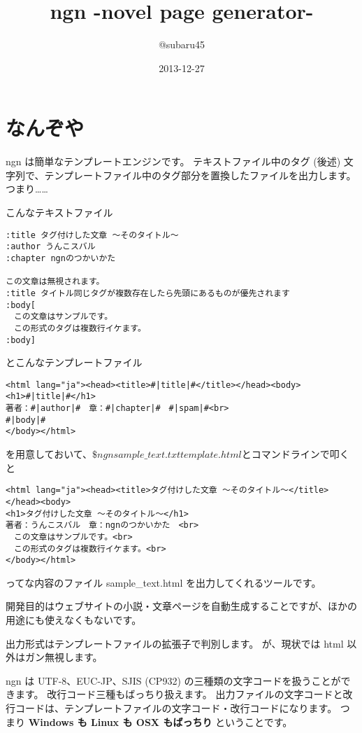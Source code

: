 \documentclass[a4j]{jsarticle}
\begin{document}
\title{ngn -novel page generator-}
\author{@subaru45}
\date{2013-12-27}
\maketitle


\section{なんぞや}
ngn は簡単なテンプレートエンジンです。
テキストファイル中のタグ (後述) 文字列で、テンプレートファイル中のタグ部分を置換したファイルを出力します。
つまり……

こんなテキストファイル
\begin{lstlisting}[caption=sample\_text.txt]
:title タグ付けした文章 ～そのタイトル～
:author うんこスバル
:chapter ngnのつかいかた

この文章は無視されます。
:title タイトル同じタグが複数存在したら先頭にあるものが優先されます
:body[
　この文章はサンプルです。
　この形式のタグは複数行イケます。
:body]
\end{lstlisting}
とこんなテンプレートファイル
\begin{lstlisting}[caption=template.html]
<html lang="ja"><head><title>#|title|#</title></head><body>
<h1>#|title|#</h1>
著者：#|author|#　章：#|chapter|#　#|spam|#<br>
#|body|#
</body></html>
\end{lstlisting}
を用意しておいて、$\$ngn sample\_text.txt template.html$とコマンドラインで叩くと
\begin{lstlisting}[caption=sample\_text.html]
<html lang="ja"><head><title>タグ付けした文章 ～そのタイトル～</title></head><body>
<h1>タグ付けした文章 ～そのタイトル～</h1>
著者：うんこスバル　章：ngnのつかいかた　<br>
　この文章はサンプルです。<br>
　この形式のタグは複数行イケます。<br>
</body></html>
\end{lstlisting}
ってな内容のファイル sample\_text.html を出力してくれるツールです。


開発目的はウェブサイトの小説・文章ページを自動生成することですが、ほかの用途にも使えなくもないです。

出力形式はテンプレートファイルの拡張子で判別します。
が、現状では html 以外はガン無視します。

ngn は UTF-8、EUC-JP、SJIS (CP932) の三種類の文字コードを扱うことができます。
改行コード三種もばっちり扱えます。
出力ファイルの文字コードと改行コードは、テンプレートファイルの文字コード・改行コードになります。
つまり \textbf{Windows も Linux も OSX もばっちり} ということです。
\end{document}
